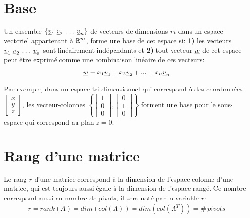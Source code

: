 \section{Base}
\label{sec:base}

Un ensemble $\{ \underline{v}_1 \; \underline{v}_2 \; \hdots \; \underline{v}_n \}$ de vecteurs de dimensions $m$ dans un espace vectoriel appartenant à $\operatorname{\mathbb{R}}^m$, forme une base de cet espace si: \textbf{1)} les vecteurs $\underline{v}_1 \; \underline{v}_2 \; \hdots \; \underline{v}_n$ sont linéairement indépendants et \textbf{2)} tout vecteur $\underline{w}$ de cet espace peut être exprimé comme une combinaison linéaire de ces vecteurs:
\begin{align}
\underline{w} = x_1 \underline{v}_1 + x_2 \underline{v}_2 + ... + x_n \underline{v}_n
\end{align}

Par exemple, dans un espace tri-dimensionnel qui correspond à des coordonnées $
\left[
\begin{array}{c}
x \\ y \\ z
\end{array}
\right]
$, les vecteur-colonnes $\left\{ 
\left[
\begin{array}{c}
1 \\ 0 \\ 0
\end{array}
\right],
\left[
\begin{array}{c}
0 \\ 1 \\ 0
\end{array}
\right]
\right\}$
forment une base pour le sous-espace qui correspond au plan $z=0$.

\section{Rang d'une matrice}
\label{sec:rang}

Le rang $r$ d'une matrice correspond à la dimension de l'espace colonne d'une matrice, qui est toujours aussi égale à la dimension de l'espace rangé. Ce nombre correspond aussi au nombre de pivots, il sera noté par la variable $r$:
\begin{align}
r = rank( A ) = dim( col(A) ) = dim( col(A^T) ) =\#\, pivots
\end{align}


